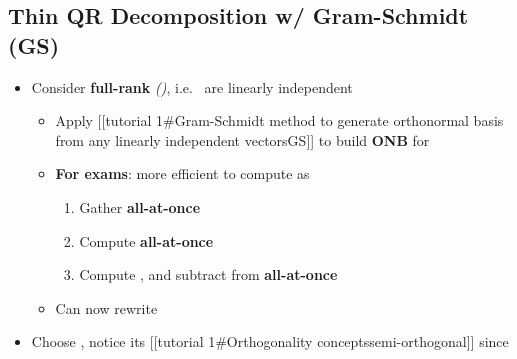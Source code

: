 \subsection*{Thin QR Decomposition w/ Gram-Schmidt
(GS)}

\begin{itemize}

\item
  Consider \textbf{full-rank}
  \emph{()},
  i.e.~
  are linearly independent

  \begin{itemize}
  
  \item
    Apply {[}{[}tutorial 1\#Gram-Schmidt method to generate orthonormal
    basis from any linearly independent vectors\textbar GS{]}{]}
    to build \textbf{ONB}
    for 
  \item
    \textbf{For exams}: more efficient to compute as

    \begin{enumerate}
    \def\labelenumi{\arabic{enumi})}
    
    \item
      Gather
      \textbf{all-at-once}
    \item
      Compute
      \textbf{all-at-once}
    \item
      Compute , and
      subtract from  \textbf{all-at-once}
    \end{enumerate}
  \item
    Can now rewrite
  \end{itemize}
\item
  Choose
  ,
  notice its {[}{[}tutorial 1\#Orthogonality
  concepts\textbar semi-orthogonal{]}{]} since


\end{itemize}
